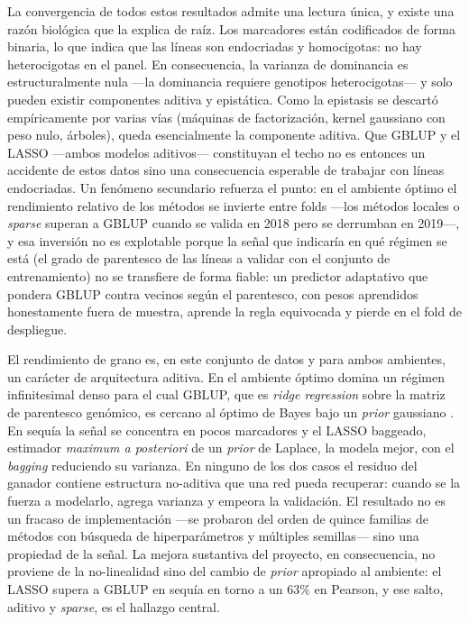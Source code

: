 La convergencia de todos estos resultados admite una lectura única, y existe una razón
biológica que la explica de raíz. Los marcadores están codificados de forma binaria, lo que
indica que las líneas son endocriadas y homocigotas: no hay heterocigotas en el panel. En
consecuencia, la varianza de dominancia es estructuralmente nula —la dominancia requiere
genotipos heterocigotas— y solo pueden existir componentes aditiva y epistática. Como la
epistasis se descartó empíricamente por varias vías (máquinas de factorización, kernel
gaussiano con peso nulo, árboles), queda esencialmente la componente aditiva. Que GBLUP y el
LASSO —ambos modelos aditivos— constituyan el techo no es entonces un accidente de estos
datos sino una consecuencia esperable de trabajar con líneas endocriadas. Un fenómeno
secundario refuerza el punto: en el ambiente óptimo el rendimiento relativo de los métodos
se invierte entre folds —los métodos locales o \emph{sparse} superan a GBLUP cuando se
valida en 2018 pero se derrumban en 2019—, y esa inversión no es explotable porque la señal
que indicaría en qué régimen se está (el grado de parentesco de las líneas a validar con el
conjunto de entrenamiento) no se transfiere de forma fiable: un predictor adaptativo que
pondera GBLUP contra vecinos según el parentesco, con pesos aprendidos honestamente fuera de
muestra, aprende la regla equivocada y pierde en el fold de despliegue.

El rendimiento de grano es, en este conjunto de datos y para ambos ambientes, un carácter de
arquitectura aditiva.
En el ambiente óptimo domina un régimen infinitesimal denso para el cual GBLUP, que es
\emph{ridge regression} sobre la matriz de parentesco genómico, es cercano al óptimo de
Bayes bajo un \emph{prior} gaussiano \citep{bishop2024}. En sequía la señal se concentra en
pocos marcadores y el LASSO baggeado, estimador \emph{maximum a posteriori} de un
\emph{prior} de Laplace, la modela mejor, con el \emph{bagging} reduciendo su varianza. En
ninguno de los dos casos el residuo del ganador contiene estructura no-aditiva que una red
pueda recuperar: cuando se la fuerza a modelarlo, agrega varianza y empeora la validación.
El resultado no es un fracaso de implementación —se probaron del orden de quince familias
de métodos con búsqueda de hiperparámetros y múltiples semillas— sino una propiedad de la
señal. La mejora sustantiva del proyecto, en consecuencia, no proviene de la no-linealidad
sino del cambio de \emph{prior} apropiado al ambiente: el LASSO supera a GBLUP en sequía en
torno a un $63\%$ en Pearson, y ese salto, aditivo y \emph{sparse}, es el hallazgo central.
